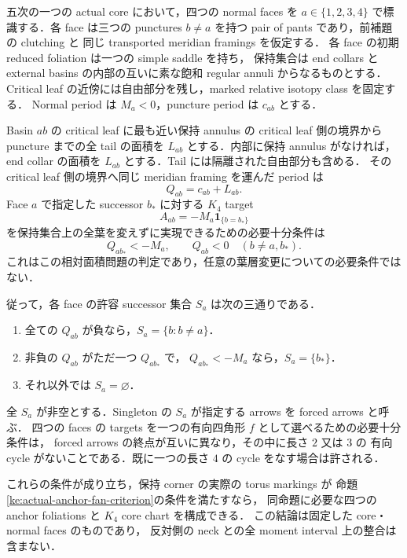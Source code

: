 \begin{corollary}
\label{ke:k4-protected-anchor-selection}
五次の一つの actual core において，四つの normal faces を
$a\in\{1,2,3,4\}$ で標識する．各 face は三つの punctures
$b\ne a$ を持つ pair of pants であり，前補題の clutching と
同じ transported meridian framings を仮定する．
各 face の初期 reduced foliation は一つの simple saddle を持ち，
保持集合は end collars と external basins の内部の互いに素な飽和
regular annuli からなるものとする．
Critical leaf の近傍には自由部分を残し，marked relative isotopy class を固定する．
Normal period は $M_a<0$，puncture period は $c_{ab}$ とする．

Basin $ab$ の critical leaf に最も近い保持 annulus の critical leaf 側の境界から
puncture までの全 tail の面積を $L_{ab}$ とする．内部に保持 annulus がなければ，
end collar の面積を $L_{ab}$ とする．Tail には隔離された自由部分も含める．
その critical leaf 側の境界へ同じ meridian framing を運んだ period は
\begin{equation}\label{ke:eq:k4-protected-period}
 Q_{ab}=c_{ab}+L_{ab}.
\end{equation}
Face $a$ で指定した successor $b_*$ に対する $K_4$ target
\[
 A_{ab}=-M_a\mathbf1_{\{b=b_*\}}
\]
を保持集合上の全葉を変えずに実現できるための必要十分条件は
\begin{equation}\label{ke:eq:k4-protected-inequalities}
 Q_{ab_*}<-M_a,\qquad Q_{ab}<0\quad(b\ne a,b_*).
\end{equation}
これはこの相対面積問題の判定であり，任意の葉層変更についての必要条件ではない．

従って，各 face の許容 successor 集合 $S_a$ は次の三通りである．
\begin{enumerate}
\item 全ての $Q_{ab}$ が負なら，$S_a=\{b:b\ne a\}$．
\item 非負の $Q_{ab}$ がただ一つ $Q_{ab_*}$ で，
      $Q_{ab_*}<-M_a$ なら，$S_a=\{b_*\}$．
\item それ以外では $S_a=\varnothing$．
\end{enumerate}
全 $S_a$ が非空とする．Singleton の $S_a$ が指定する arrows を forced arrows と呼ぶ．
四つの faces の targets を一つの有向四角形 $f$ として選べるための必要十分条件は，
forced arrows の終点が互いに異なり，その中に長さ $2$ 又は $3$ の
有向 cycle がないことである．既に一つの長さ $4$ の cycle をなす場合は許される．

これらの条件が成り立ち，保持 corner の実際の torus markings が
命題\ref{ke:actual-anchor-fan-criterion}の条件を満たすなら，
同命題に必要な四つの anchor foliations と $K_4$ core chart を構成できる．
この結論は固定した core・normal faces のものであり，
反対側の neck との全 moment interval 上の整合は含まない．
\end{corollary}

